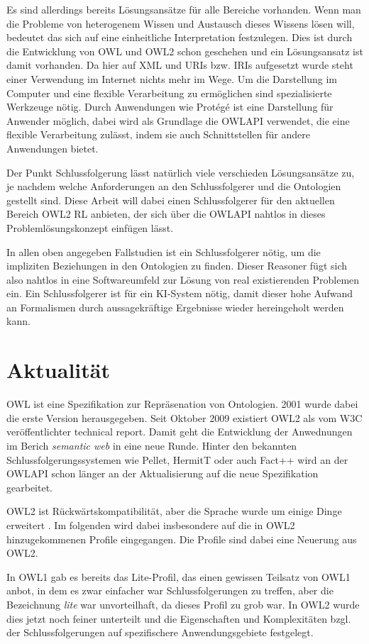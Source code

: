 Es sind allerdings bereits Lösungsansätze für alle Bereiche vorhanden. Wenn man die Probleme von heterogenem Wissen und Austausch dieses Wissens lösen will, bedeutet das sich auf eine einheitliche Interpretation festzulegen. Dies ist durch die Entwicklung von OWL und OWL2 schon geschehen und ein Lösungsansatz ist damit vorhanden. Da hier auf XML und URIs bzw. IRIs aufgesetzt wurde steht einer Verwendung im Internet nichts mehr im Wege. Um die Darstellung im Computer und eine flexible Verarbeitung zu ermöglichen sind spezialisierte Werkzeuge nötig. Durch Anwendungen wie Protégé ist eine Darstellung für Anwender möglich, dabei wird als Grundlage die OWLAPI verwendet, die eine flexible Verarbeitung zulässt, indem sie auch Schnittstellen für andere Anwendungen bietet.

Der Punkt Schlussfolgerung lässt natürlich viele verschieden Lösungsansätze zu, je nachdem welche Anforderungen an den Schlussfolgerer und die Ontologien gestellt sind. Diese Arbeit will dabei einen Schlussfolgerer für den aktuellen Bereich OWL2 RL anbieten, der sich über die OWLAPI nahtlos in dieses Problemlösungskonzept einfügen lässt.

In allen oben angegeben Fallstudien ist ein Schlussfolgerer nötig, um die impliziten Beziehungen in den Ontologien zu finden. Dieser Reasoner fügt sich also nahtlos in eine Softwareumfeld zur Lösung von real existierenden Problemen ein. Ein Schlussfolgerer ist für ein KI-System nötig, damit dieser hohe Aufwand an Formalismen durch aussagekräftige Ergebnisse wieder hereingeholt werden kann.


\section{Aktualität}
OWL ist eine Spezifikation zur Repräsenation von Ontologien. 2001 wurde dabei die erste Version herausgegeben. Seit Oktober 2009 existiert OWL2 als vom W3C veröffentlichter technical report. Damit geht die Entwicklung der Anwednungen im Berich \emph{semantic web} in eine neue Runde. Hinter den bekannten Schlussfolgerungssystemen wie Pellet, HermitT oder auch Fact++ wird an der OWLAPI schon länger an der Aktualisierung auf die neue Spezifikation gearbeitet.

OWL2 ist Rückwärtskompatibilität, aber die Sprache wurde um einige Dinge erweitert \cite{Golbreich2008}. Im folgenden wird dabei  insbesondere auf die in OWL2 hinzugekommenen Profile eingegangen. Die Profile sind dabei eine Neuerung aus OWL2.

In OWL1 gab es bereits das Lite-Profil, das einen gewissen Teilsatz von OWL1 anbot, in dem es zwar einfacher war Schlussfolgerungen zu treffen, aber die Bezeichnung \emph{lite} war unvorteilhaft, da dieses Profil zu grob war. In OWL2 wurde dies jetzt noch feiner unterteilt und die Eigenschaften und Komplexitäten bzgl. der Schlussfolgerungen auf spezifischere Anwendungsgebiete festgelegt.


